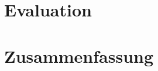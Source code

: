 \documentclass[a4paper, 11pt, twocolumn]{article}
\begin{document}

\section{Evaluation} %
\label{sec:evaluation}


\section{Zusammenfassung} %
\label{sec:zusammenfassung}




\end{document}
